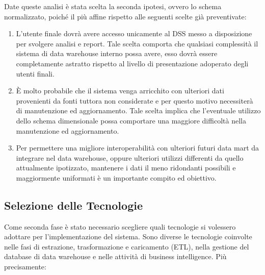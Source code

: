 Date queste analisi è stata scelta la seconda ipotesi, ovvero lo schema normalizzato, poiché il più affine rispetto alle seguenti scelte già preventivate:

\begin{enumerate}
    \item L'utente finale dovrà avere accesso unicamente al DSS messo a disposizione per svolgere analisi e report. Tale scelta comporta che qualsiasi complessità il sistema di data warehouse interno possa avere, esso dovrà essere completamente astratto rispetto al livello di presentazione adoperato degli utenti finali.
    \item È molto probabile che il sistema venga arricchito con ulteriori dati provenienti da fonti tuttora non considerate e per questo motivo necessiterà di manutenzione ed aggiornamento. Tale scelta implica che l'eventuale utilizzo dello schema dimensionale possa comportare una maggiore difficoltà nella manutenzione ed aggiornamento.
    \item Per permettere una migliore interoperabilità con ulteriori futuri data mart da integrare nel data warehouse, oppure ulteriori utilizzi differenti da quello attualmente ipotizzato, mantenere i dati il meno ridondanti possibili e maggiormente uniformati è un importante compito ed obiettivo.
\end{enumerate}

\subsection{Selezione delle Tecnologie}

Come seconda fase è stato necessario scegliere quali tecnologie si volessero adottare per l'implementazione del sistema. Sono diverse le tecnologie coinvolte nelle fasi di estrazione, trasformazione e caricamento (ETL), nella gestione del database di data warehouse e nelle attività di business intelligence. Più precisamente:

